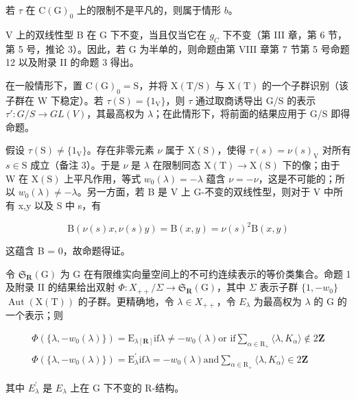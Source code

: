 若 \(\tau\) 在 \(\mathrm{C}(\mathrm{G})_0\) 上的限制不是平凡的，则属于情形 \(b\)。

V 上的双线性型 B 在 G 下不变，当且仅当它在 \(g_{C}\) 下不变（第 III 章，第 6 节，第 5 号，推论 3）。因此，若 G 为半单的，则命题由第 VIII 章第 7 节第 5 号命题 12 以及附录 II 的命题 3 得出。

在一般情形下，置 \(\mathrm{C}(\mathrm{G})_{0} = \mathrm{S}\)，并将 \(\mathrm{X}(\mathrm{T}/\mathrm{S})\) 与 \(\mathrm{X}(\mathrm{T})\) 的一个子群识别（该子群在 W 下稳定）。若 \(\tau(\mathrm{S}) = \{1_{\mathrm{V}}\}\)，则 \(\tau\) 通过取商诱导出 G/S 的表示 \(\tau' : G/S \to GL(V)\)，其最高权为 \(\lambda\)；在此情形下，将前面的结果应用于 G/S 即得命题。

假设 \(\tau (\mathrm{S})\neq \{1_{\mathrm{V}}\}\)。存在非零元素 \(\nu\) 属于 \(\mathrm{X(S)}\)，使得 \(\tau (s) = \nu (s)_{\mathrm{V}}\) 对所有 \(s\in \mathrm{S}\) 成立（备注 3）。于是 \(\nu\) 是 \(\lambda\) 在限制同态 \(\mathrm{X}(\mathrm{T})\to\mathrm{X}(\mathrm{S})\) 下的像；由于 W 在 \(\mathrm{X}(\mathrm{S})\) 上平凡作用，等式 \(w_{0}(\lambda)=-\lambda\) 蕴含 \(\nu=-\nu\)，这是不可能的；所以 \(w_{0}(\lambda)\neq-\lambda\)。另一方面，若 B 是 V 上 G-不变的双线性型，则对于 V 中所有 x,y 以及 S 中 s，有

\[
\mathrm{B} (\nu (s) x, \nu (s) y) = \mathrm{B} (x, y) = \nu (s) ^ {2} \mathrm{B} (x, y)
\]

这蕴含 B = 0，故命题得证。

令 \(\mathfrak{S}_{\mathbf{R}}(\mathrm{G})\) 为 G 在有限维实向量空间上的不可约连续表示的等价类集合。命题 1 及附录 II 的结果给出双射 \(\Phi:X_{++}/\Sigma\to\mathfrak{S}_{\mathbf{R}}(\mathrm{G})\)，其中 \(\Sigma\) 表示子群 \(\{1,-w_{0}\}\) \(\operatorname{Aut}(\mathrm{X}(\mathrm{T}))\) 的子群。更精确地，令 \(\lambda\in X_{++}\)，令 \(E_{\lambda}\) 为最高权为 \(\lambda\) 的 G 的一个表示；则

\[
\begin{array}{c} \Phi (\{\lambda , - w _ {0} (\lambda) \}) = \mathrm{E} _ {\lambda [ \mathbf {R} ]} \text {if} \lambda \neq - w _ {0} (\lambda) \text {or if} \sum_ {\alpha \in \mathrm{R} _ {+}} \langle \lambda , K _ {\alpha} \rangle \notin 2 \mathbf {Z} \\ \Phi (\{\lambda , - w _ {0} (\lambda) \}) = \mathrm{E} _ {\lambda} ^ {\prime} \text {if} \lambda = - w _ {0} (\lambda) \text {and} \sum_ {\alpha \in \mathrm{R} _ {+}} \langle \lambda , K _ {\alpha} \rangle \in 2 \mathbf {Z} \end{array}
\]

其中 \(E_{\lambda}^{\prime}\) 是 \(E_{\lambda}\) 上在 G 下不变的 R-结构。

